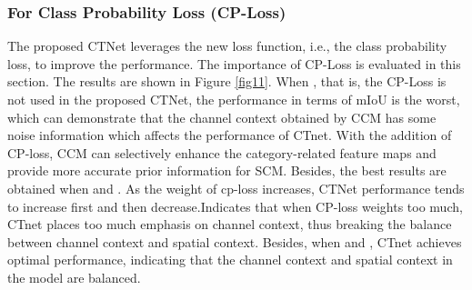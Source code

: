 \documentclass[10pt,journal,cspaper,compsoc]{IEEEtran}
\begin{document}
	
\subsubsection{For Class Probability Loss (CP-Loss)}
The proposed CTNet leverages the new loss function, i.e., the class probability loss, to improve the performance. The importance of CP-Loss is evaluated in this section. The results are shown in Figure \ref{fig11}. When , that is, the CP-Loss is not used in the proposed CTNet, the performance in terms of mIoU is the worst, which can demonstrate that the channel context obtained by CCM has some noise information which affects the performance of CTnet. With the addition of CP-loss, CCM can selectively enhance the category-related feature maps and provide more accurate prior information for SCM. Besides, the best results are obtained when  and . As the weight of cp-loss increases, CTNet performance tends to increase first and then decrease.Indicates that when CP-loss weights too much, CTnet places too much emphasis on channel context, thus breaking the balance between channel context and spatial context. Besides, when  and , CTnet achieves optimal performance, indicating that the channel context and spatial context in the model are balanced.
\end{document}
